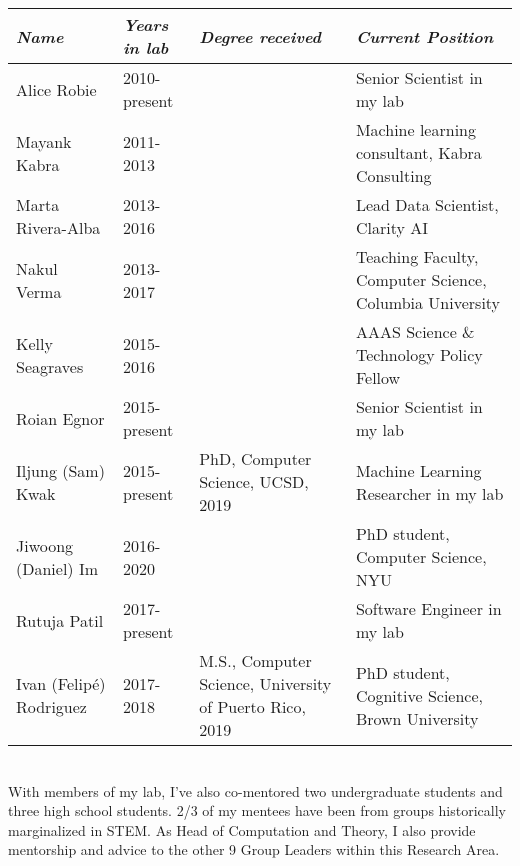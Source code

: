 \documentclass[11pt, letterpaper]{awesome-cv}
\begin{document}
\begingroup
\begin{center}
\fontsize{10pt}{1em}\bodyfont\upshape\selectfont
\setlength{\tabcolsep}{6pt}
\begin{tabular}{ll>{\raggedright\arraybackslash}p{2in}>{\raggedright\arraybackslash}p{2.5in}}
\hline
  {\em Name} & {\em Years in lab} & {\em Degree received} & {\em Current Position} \\\hline\hline
  Alice Robie & 2010-present & & Senior Scientist in my lab \\
  Mayank Kabra & 2011-2013 & & Machine learning consultant, Kabra Consulting \\
  Marta Rivera-Alba & 2013-2016& & Lead Data Scientist, Clarity AI\\
  Nakul Verma & 2013-2017 & & Teaching Faculty, Computer Science, Columbia University\\
  Kelly Seagraves & 2015-2016 & & AAAS Science \& Technology Policy Fellow\\
  Roian Egnor & 2015-present & & Senior Scientist in my lab\\
  Iljung (Sam) Kwak & 2015-present & PhD, Computer Science, UCSD, 2019 & Machine Learning Researcher in my lab\\
  Jiwoong (Daniel) Im & 2016-2020 & & PhD student, Computer Science, NYU\\
  Rutuja Patil & 2017-present & & Software Engineer in my lab\\
  Ivan (Felip\'e) Rodriguez & 2017-2018 & M.S., Computer Science, University of Puerto Rico, 2019 & PhD student, Cognitive Science, Brown University \\\hline
\end{tabular}
\end{center}
\endgroup
\\
\vspace{.25cm}
With members of my lab, I've also co-mentored two undergraduate students and three high school students. 2/3 of my mentees have been from groups historically marginalized in STEM. As Head of Computation and Theory, I also provide mentorship and advice to the other 9 Group Leaders within this Research Area. 
\vspace{\acvSectionContentTopSkip}

\vspace{\acvSectionContentTopSkip}
\vspace{2mm}
\end{document}
